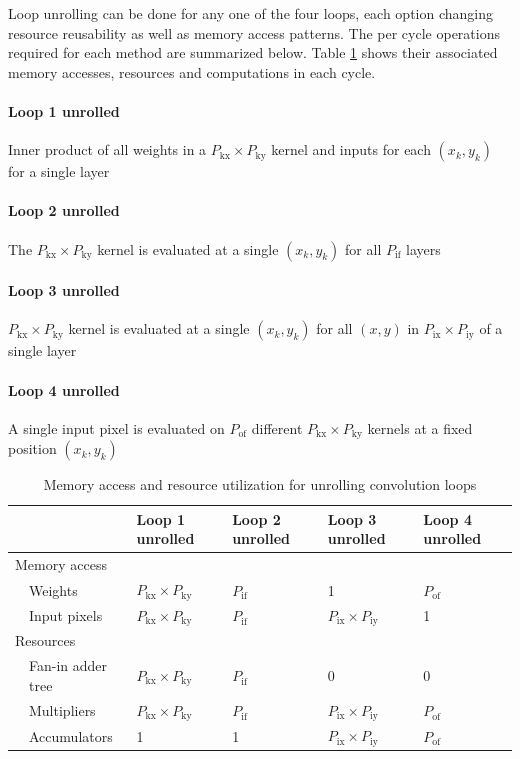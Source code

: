 \documentclass{uw-ece-wkrpt}
\begin{document}
Loop unrolling can be done for any one of the four loops, each option changing resource reusability as well as memory access patterns. The per cycle operations required for each method are summarized below. Table \ref{tab:unrolling} shows their associated memory accesses, resources and computations in each cycle.

\paragraph{Loop 1 unrolled}
Inner product of all weights in a $P_\mathrm{kx} \times P_\mathrm{ky}$ \gls{kernel} and inputs for each $(x_k, y_k)$ for a single layer
\paragraph{Loop 2 unrolled}
The $P_\mathrm{kx} \times P_\mathrm{ky}$ \gls{kernel} is evaluated at a single $(x_k, y_k)$ for all $P_\mathrm{if}$ layers
\paragraph{Loop 3 unrolled}
$P_\mathrm{kx} \times P_\mathrm{ky}$ \gls{kernel} is evaluated at a single $(x_k, y_k)$ for all $(x, y)$ in $P_\mathrm{ix} \times P_\mathrm{iy}$ of a single layer
\paragraph{Loop 4 unrolled}
A single input pixel is evaluated on $P_\mathrm{of}$  different $P_\mathrm{kx} \times P_\mathrm{ky}$ \glspl{kernel} at a fixed position $(x_k, y_k)$

\begin{table}[hbp]
\centering
\caption{Memory access and resource utilization for unrolling convolution loops}\label{tab:unrolling}
\begin{tabular}{ll llll}
\toprule
            && Loop 1 unrolled & Loop 2 unrolled & Loop 3 unrolled & Loop 4 unrolled \\
\midrule
\multicolumn{6}{l}{Memory access} \\
& Weights & $P_\mathrm{kx} \times P_\mathrm{ky}$ & $P_\mathrm{if}$ & 1 & $P_\mathrm{of}$ \\
& Input pixels & $P_\mathrm{kx} \times P_\mathrm{ky}$ & $P_\mathrm{if}$ & $P_\mathrm{ix} \times P_\mathrm{iy}$ & 1 \\
\multicolumn{6}{l}{Resources} \\
& Fan-in adder tree & $P_\mathrm{kx} \times P_\mathrm{ky}$ & $P_\mathrm{if}$ & 0 & 0 \\
& Multipliers & $P_\mathrm{kx} \times P_\mathrm{ky}$ & $P_\mathrm{if}$ & $P_\mathrm{ix} \times P_\mathrm{iy}$ & $P_\mathrm{of}$ \\
& Accumulators & 1 & 1 & $P_\mathrm{ix} \times P_\mathrm{iy}$ & $P_\mathrm{of}$ \\
\bottomrule
\end{tabular}
\end{table}
\end{document}

